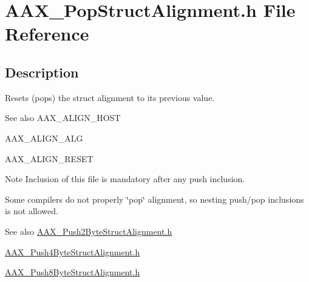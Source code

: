\hypertarget{a00653}{}\section{A\+A\+X\+\_\+\+Pop\+Struct\+Alignment.\+h File Reference}
\label{a00653}


\subsection{Description}
Resets (pops) the struct alignment to its previous value. 

\begin{DoxySeeAlso}{See also}
A\+A\+X\+\_\+\+A\+L\+I\+G\+N\+\_\+\+H\+O\+ST 

A\+A\+X\+\_\+\+A\+L\+I\+G\+N\+\_\+\+A\+LG 

A\+A\+X\+\_\+\+A\+L\+I\+G\+N\+\_\+\+R\+E\+S\+ET
\end{DoxySeeAlso}
\begin{DoxyNote}{Note}
Inclusion of this file is mandatory after any \textquotesingle{}push\textquotesingle{} inclusion. 

Some compilers do not properly \char`\"{}pop\char`\"{} alignment, so nesting push/pop inclusions is not allowed.
\end{DoxyNote}
\begin{DoxySeeAlso}{See also}
\mbox{\hyperlink{a00665}{A\+A\+X\+\_\+\+Push2\+Byte\+Struct\+Alignment.\+h}} 

\mbox{\hyperlink{a00668}{A\+A\+X\+\_\+\+Push4\+Byte\+Struct\+Alignment.\+h}} 

\mbox{\hyperlink{a00671}{A\+A\+X\+\_\+\+Push8\+Byte\+Struct\+Alignment.\+h}} 
\end{DoxySeeAlso}
